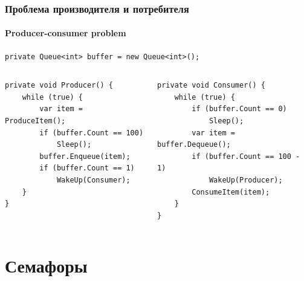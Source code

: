 \documentclass{../../slides-style}
\begin{document}
    \begin{frame}[fragile]
        \frametitle{Проблема производителя и потребителя}
        \framesubtitle{Producer-consumer problem}
        \begin{footnotesize}
            \begin{verbatim}
private Queue<int> buffer = new Queue<int>();
            \end{verbatim}
            \begin{columns}
                \begin{column}{0.5\textwidth}
                    \begin{verbatim}
private void Producer() {
    while (true) {
        var item = ProduceItem();
        if (buffer.Count == 100)
            Sleep();
        buffer.Enqueue(item);
        if (buffer.Count == 1)
            WakeUp(Consumer);
    }
}
                    \end{verbatim}
                \end{column}
                \begin{column}{0.5\textwidth}
                    \begin{verbatim}
private void Consumer() {
    while (true) {
        if (buffer.Count == 0)
            Sleep();
        var item = buffer.Dequeue();
        if (buffer.Count == 100 - 1)
            WakeUp(Producer);
        ConsumeItem(item);
    }
}
                    \end{verbatim}
                \end{column}
            \end{columns}
        \end{footnotesize}
    \end{frame}

    \section{Семафоры}
\end{document}
